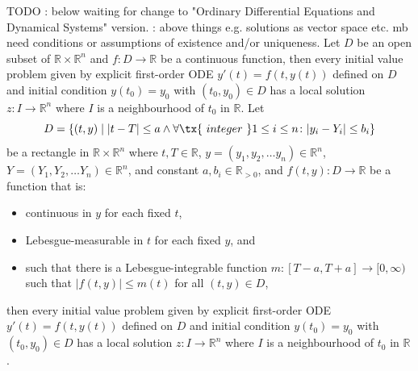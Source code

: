 \documentclass[a4paper,12pt]{report}
\begin{document}
TODO
: below waiting for change to "Ordinary Differential Equations and Dynamical Systems" version.
: above things e.g. solutions as vector space etc. mb need conditions or assumptions of existence and/or uniqueness.
Let $D$ be an open subset of $\mathbb{R}\times\mathbb{R}^n$ and $f\colon D\to \mathbb {R}$ be a continuous function, then every initial value problem given by explicit first-order ODE $y'(t)=f\left(t,y(t)\right)$ defined on $D$ and initial condition $y\left(t_{0}\right)=y_{0}$ with $(t_{0},y_{0})\in D$ has a local solution $z\colon I\to \mathbb {R}^n$ where $I$ is a neighbourhood of $t_0$ in $\mathbb {R} $.
Let
\[D=\{(t,y)\mid|t-T|\leq a\land\forall\tx{\ integer\ }1\leq i\leq n\colon |y_i-Y_i|\leq b_i\}\]
be a rectangle in $\mathbb{R}\times\mathbb{R}^n$ where $t,T\in\mathbb{R}$, $y=(y_1, y_2,\dots  y_n)\in\mathbb{R}^n$, $Y=(Y_1, Y_2,\dots  Y_n)\in\mathbb{R}^n$, and constant $a,b_i\in\mathbb{R}_{>0}$, and $f(t,y)\colon D\to \mathbb {R}$ be a function that is:
\begin{itemize}
\item continuous in $y$ for each fixed $t$,
\item Lebesgue-measurable in $t$ for each fixed $y$, and
\item such that there is a Lebesgue-integrable function $m\colon [T-a,T+a]\to [0,\infty )$ such that $|f(t,y)|\leq m(t)$ for all $(t,y)\in D$,
\end{itemize}
then every initial value problem given by explicit first-order ODE $y'(t)=f\left(t,y(t)\right)$ defined on $D$ and initial condition $y\left(t_{0}\right)=y_{0}$ with $(t_{0},y_{0})\in D$ has a local solution $z\colon I\to \mathbb {R}^n$ where $I$ is a neighbourhood of $t_0$ in $\mathbb{R}$.
\end{document}
